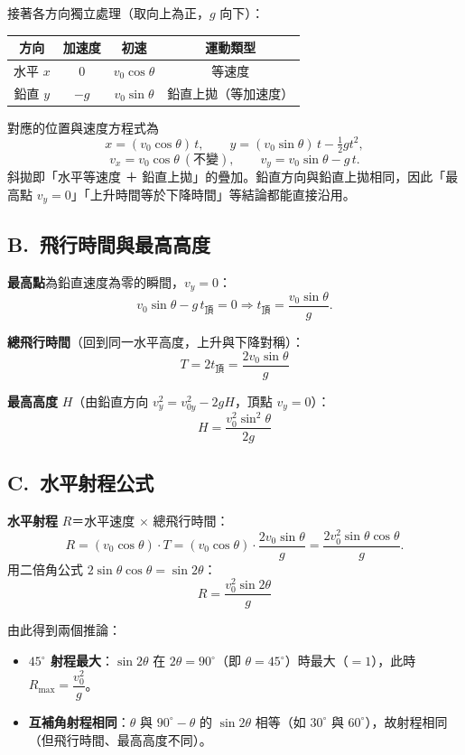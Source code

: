 \documentclass[11pt]{article}
\begin{document}
接著各方向獨立處理（取向上為正，$g$ 向下）：

\begin{center}
\renewcommand{\arraystretch}{1.3}
\begin{tabular}{c c c c}
\hline
\textbf{方向} & \textbf{加速度} & \textbf{初速} & \textbf{運動類型} \\
\hline
水平 $x$ & $0$ & $v_0\cos\theta$ & 等速度 \\
鉛直 $y$ & $-g$ & $v_0\sin\theta$ & 鉛直上拋（等加速度） \\
\hline
\end{tabular}
\end{center}

對應的位置與速度方程式為
$$x=(v_0\cos\theta)\,t,\qquad y=(v_0\sin\theta)\,t-\tfrac12 g t^2,$$
$$v_x=v_0\cos\theta\ (\text{不變}),\qquad v_y=v_0\sin\theta-g\,t.$$
斜拋即「水平等速度 ＋ 鉛直上拋」的疊加。鉛直方向與鉛直上拋相同，因此「最高點 $v_y=0$」「上升時間等於下降時間」等結論都能直接沿用。

\subsection*{\sffamily B.\ 飛行時間與最高高度}

\textbf{最高點}為鉛直速度為零的瞬間，$v_y=0$：
$$v_0\sin\theta-g\,t_{\text{頂}}=0\Rightarrow t_{\text{頂}}=\frac{v_0\sin\theta}{g}.$$

\textbf{總飛行時間}（回到同一水平高度，上升與下降對稱）：
$$\boxed{\,T=2t_{\text{頂}}=\frac{2v_0\sin\theta}{g}\,}$$

\textbf{最高高度} $H$（由鉛直方向 $v_y^2=v_{0y}^2-2gH$，頂點 $v_y=0$）：
$$\boxed{\,H=\frac{v_0^2\sin^2\theta}{2g}\,}$$

\subsection*{\sffamily C.\ 水平射程公式}

\textbf{水平射程} $R$＝水平速度 $\times$ 總飛行時間：
$$R=(v_0\cos\theta)\cdot T=(v_0\cos\theta)\cdot\frac{2v_0\sin\theta}{g}=\frac{2v_0^2\sin\theta\cos\theta}{g}.$$
用二倍角公式 $2\sin\theta\cos\theta=\sin 2\theta$：
$$\boxed{\,R=\frac{v_0^2\sin 2\theta}{g}\,}$$

由此得到兩個推論：
\begin{itemize}\setlength{\itemsep}{1pt}
\item \textbf{$45^\circ$ 射程最大}：$\sin 2\theta$ 在 $2\theta=90^\circ$（即 $\theta=45^\circ$）時最大（$=1$），此時 $R_{\max}=\dfrac{v_0^2}{g}$。
\item \textbf{互補角射程相同}：$\theta$ 與 $90^\circ-\theta$ 的 $\sin 2\theta$ 相等（如 $30^\circ$ 與 $60^\circ$），故射程相同（但飛行時間、最高高度不同）。
\end{itemize}
\end{document}
